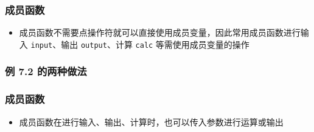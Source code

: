 \begin{frame}[fragile]
    \frametitle{成员函数}
    
    \begin{itemize}
        \item 成员函数不需要点操作符就可以直接使用成员变量，因此常用成员函数进行输入 \lstinline|input|、输出 \lstinline|output|、计算 \lstinline|calc| 等需使用成员变量的操作
        
    \end{itemize}

\end{frame}

\begin{frame}[fragile]
    \frametitle{例 7.2 的两种做法}
    
        

\end{frame}

\begin{frame}[fragile]
    \frametitle{成员函数}
    
    \begin{itemize}
        \item 成员函数在进行输入、输出、计算时，也可以传入参数进行运算或输出
        
    \end{itemize}

\end{frame}


